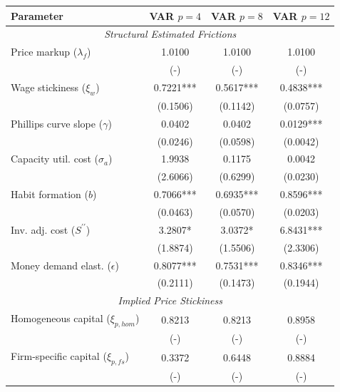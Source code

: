 \begin{table}[htpb]
    \centering
    \scriptsize
    \begin{tabular}{lccc}
    \toprule
    \textbf{Parameter} & \textbf{VAR $p=4$} & \textbf{VAR $p=8$} & \textbf{VAR $p=12$} \\
    \midrule \multicolumn{4}{c}{\textit{Structural Estimated Frictions}} \\
    Price markup ($\lambda_f$) & 1.0100 & 1.0100 & 1.0100 \\
    & (-) & (-) & (-) \\
    Wage stickiness ($\xi_w$) & 0.7221*** & 0.5617*** & 0.4838*** \\
    & (0.1506) & (0.1142) & (0.0757) \\
    Phillips curve slope ($\gamma$) & 0.0402 & 0.0402 & 0.0129*** \\
    & (0.0246) & (0.0598) & (0.0042) \\
    Capacity util. cost ($\sigma_a$) & 1.9938 & 0.1175 & 0.0042 \\
    & (2.6066) & (0.6299) & (0.0230) \\
    Habit formation ($b$) & 0.7066*** & 0.6935*** & 0.8596*** \\
    & (0.0463) & (0.0570) & (0.0203) \\
    Inv. adj. cost ($S^{\prime\prime}$) & 3.2807* & 3.0372* & 6.8431*** \\
    & (1.8874) & (1.5506) & (2.3306) \\
    Money demand elast. ($\epsilon$) & 0.8077*** & 0.7531*** & 0.8346*** \\
    & (0.2111) & (0.1473) & (0.1944) \\
    \midrule \multicolumn{4}{c}{\textit{Implied Price Stickiness}} \\
    Homogeneous capital ($\xi_{p, hom}$) & 0.8213 & 0.8213 & 0.8958 \\
    & (-) & (-) & (-) \\
    Firm-specific capital ($\xi_{p, fs}$) & 0.3372 & 0.6448 & 0.8884 \\
    & (-) & (-) & (-) \\
    \bottomrule
    \end{tabular}
\end{table}
